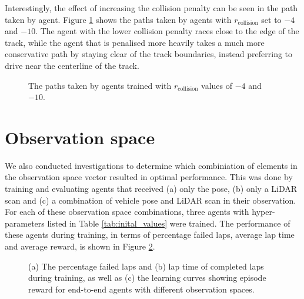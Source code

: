 

Interestingly, the effect of increasing the collision penalty can be seen in the path taken by agent.
Figure \ref{fig:path_reward_collision} shows the paths taken by agents with $r_{\text{collision}}$ set to $-4$ and $-10$.
The agent with the lower collision penalty races close to the edge of the track, while the agent that is penalised more heavily takes a much more conservative path by staying clear of the track boundaries, instead preferring to drive near the centerline of the track.

\begin{figure}[htb!]
    \centering
    
    \caption[Paths taken by agents trained with different collision penalties]{The paths taken by agents trained with $r_{\text{collision}}$ values of $-4$ and $-10$.}
    \label{fig:path_reward_collision}
\end{figure}











\section{Observation space}\label{sec:obs_space}

We also conducted investigations to determine which combiniation of elements in the observation space vector resulted in optimal performance.
This was done by training and evaluating agents that received (a) only the pose, (b) only a LiDAR scan and (c) a combination of vehicle pose and LiDAR scan in their observation.
For each of these observation space combinations, three agents with hyper-parameters listed in Table \ref{tab:inital_values} were trained.
The performance of these agents during training, in terms of percentage failed laps, average lap time and average reward, is shown in Figure \ref{fig:obs_space}.

\begin{figure}[htb!]
    \centering
    
    \caption[Learning curves of agents with different observation spaces]{(a) The percentage failed laps and (b) lap time of completed laps during training, as well as (c) the learning curves showing episode reward for end-to-end agents with different observation spaces.}
    \label{fig:obs_space}
\end{figure}


